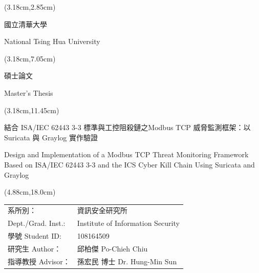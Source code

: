 
\begin{titlepage}
\thispagestyle{empty}
\setlength{\parindent}{0pt}

\begin{textblock*}{\textwidth}(3.18cm,2.85cm)
\begin{center}
{\fontsize{24}{36}\selectfont
國\hspace{1em}立\hspace{1em}清\hspace{1em}華\hspace{1em}大\hspace{1em}學\par}
{\fontsize{24}{36}\selectfont National Tsing Hua University\par}
\end{center}
\end{textblock*}

\begin{textblock*}{\textwidth}(3.18cm,7.05cm)
\begin{center}
{\fontsize{24}{36}\selectfont
碩\hspace{1.2em}士\hspace{1.2em}論\hspace{1.2em}文\par}
{\fontsize{24}{36}\selectfont Master's Thesis\par}
\end{center}
\end{textblock*}

\begin{textblock*}{\textwidth}(3.18cm,11.45cm)
\begin{center}
{\fontsize{15}{21.5}\selectfont
結合 ISA/IEC 62443 3-3 標準與工控阻殺鏈之Modbus TCP 威脅監測框架：以 Suricata 與 Graylog 實作驗證\par}
{\fontsize{14}{21}\selectfont
Design and Implementation of a Modbus TCP Threat Monitoring Framework Based on ISA/IEC 62443 3-3 and the ICS Cyber Kill Chain Using Suricata and Graylog\par}
\end{center}
\end{textblock*}

\begin{textblock*}{13.2cm}(4.88cm,18.0cm)
{\fontsize{18}{27}\selectfont
\begin{tabular}{@{}ll}
系所別： & 資訊安全研究所 \\
Dept./Grad. Inst.: & Institute of Information Security \\
學號 Student ID: & 108164509 \\
研究生 Author： & 邱柏傑 Po-Chieh Chiu \\
指導教授 Advisor： & 孫宏民 博士 Dr. Hung-Min Sun \\
\end{tabular}
}
\end{textblock*}


\end{titlepage}
